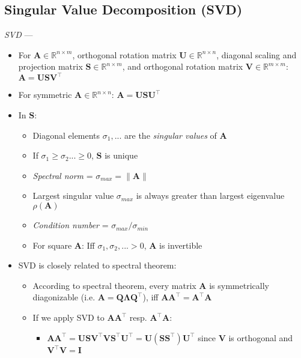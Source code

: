\subsection*{Singular Value Decomposition (SVD)}
\emph{SVD} --- 
\begin{itemize}
    \item For $\boldsymbol{A} \in \mathbb{R}^{n \times m}$, orthogonal rotation matrix $\boldsymbol{U} \in \mathbb{R}^{n \times n}$, diagonal scaling and projection matrix $\boldsymbol{S} \in \mathbb{R}^{n \times m}$, and orthogonal rotation matrix $\boldsymbol{V} \in \mathbb{R}^{m \times m}$: $\boldsymbol{A} = \boldsymbol{U} \boldsymbol{S} \boldsymbol{V}^\intercal$
    \item For symmetric $\boldsymbol{A} \in \mathbb{R}^{n \times n}$: $\boldsymbol{A} = \boldsymbol{U} \boldsymbol{S} \boldsymbol{U}^\intercal$
    \item In $\boldsymbol{S}$:
    \begin{itemize}
        \item Diagonal elements $\sigma_1, ...$ are the \emph{singular values} of $\boldsymbol{A}$
        \item If $\sigma_1 \geq \sigma_2 ... \geq 0$, $\boldsymbol{S}$ is unique
        \item \emph{Spectral norm} = $\sigma_{max} = \| \boldsymbol{A} \|$
        \item Largest singular value $\sigma_{max}$ is always greater than largest eigenvalue $\rho(\boldsymbol{A})$
        \item \emph{Condition number} = $\sigma_{max} / \sigma_{min}$
        \item For square $\boldsymbol{A}$: Iff $\sigma_1, \sigma_2, ... > 0$, $\boldsymbol{A}$ is invertible 
    \end{itemize}
    \item SVD is closely related to spectral theorem:
    \begin{itemize}
        \item According to spectral theorem, every matrix $\boldsymbol{A}$ is symmetrically diagonizable (i.e. $\boldsymbol{A} = \boldsymbol{Q} \boldsymbol{\Lambda} \boldsymbol{Q}^\intercal$), iff $\boldsymbol{A}\boldsymbol{A}^\intercal = \boldsymbol{A}^\intercal\boldsymbol{A}$
        \item If we apply SVD to $\boldsymbol{A}\boldsymbol{A}^\intercal$ resp. $\boldsymbol{A}^\intercal\boldsymbol{A}$:
        \begin{itemize}
            \item $\boldsymbol{A}\boldsymbol{A}^\intercal = \boldsymbol{U}\boldsymbol{S}\boldsymbol{V}^\intercal\boldsymbol{V}\boldsymbol{S}^\intercal\boldsymbol{U}^\intercal = \boldsymbol{U}(\boldsymbol{S}\boldsymbol{S}^\intercal)\boldsymbol{U}^\intercal$ since $\boldsymbol{V}$ is orthogonal and $\boldsymbol{V}^\intercal \boldsymbol{V} = \boldsymbol{I}$

\end{itemize}
\end{itemize}
\end{itemize}
